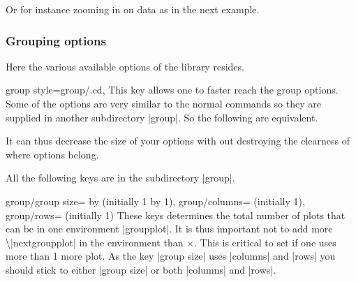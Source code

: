 \begin{command}{\nextgroupplot{} }
Or for instance zooming in on data as in the next example.
\begin{codeexample}[]
\end{codeexample}
\end{command}


\subsubsection{Grouping options}
\label{sec:pgfplots:group:options}

Here the various available options of the library resides. 

\begin{pgfplotskey}{group style=group/.cd,}
  This key allows one to faster reach the group options. Some of the options are very similar to the normal commands so they are supplied in another
  subdirectory |group|. So the following are equivalent.
\begin{codeexample}
\pgfplotsset{group/a=2,group/b=3}
\pgfplotsset{group/.cd,a=2,b=3}
\end{codeexample}
It can thus decrease the size of your options with out destroying the clearness of where options belong.
\end{pgfplotskey}
All the following keys are in the subdirectory |group|.

\begin{pgfplotskeylist}{group/group size= by  (initially 1 by 1),
      group/columns= (initially 1),
      group/rows= (initially 1)}
  These keys determines the total number of plots that can be in one environment |groupplot|. It is thus important not to add more
  \textbackslash|nextgroupplot| in the environment than $\times$. This is critical to set if one uses more than 1 more plot. As
  the key |group size| uses |columns| and |rows| you should stick to either |group size| or both |columns| and |rows|.
\end{pgfplotskeylist}

